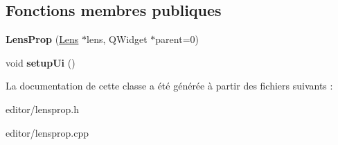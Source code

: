 \subsection*{Fonctions membres publiques}
\begin{DoxyCompactItemize}
\item 
\hypertarget{classLensProp_a2a9f54d768d72f8ad69e1572259d2a85}{{\bfseries Lens\+Prop} (\hyperlink{classLens}{Lens} $\ast$lens, Q\+Widget $\ast$parent=0)}\label{classLensProp_a2a9f54d768d72f8ad69e1572259d2a85}

\item 
\hypertarget{classLensProp_a4b21de75fded3126b60dd75e17811e97}{void {\bfseries setup\+Ui} ()}\label{classLensProp_a4b21de75fded3126b60dd75e17811e97}

\end{DoxyCompactItemize}


La documentation de cette classe a été générée à partir des fichiers suivants \+:\begin{DoxyCompactItemize}
\item 
editor/lensprop.\+h\item 
editor/lensprop.\+cpp\end{DoxyCompactItemize}
